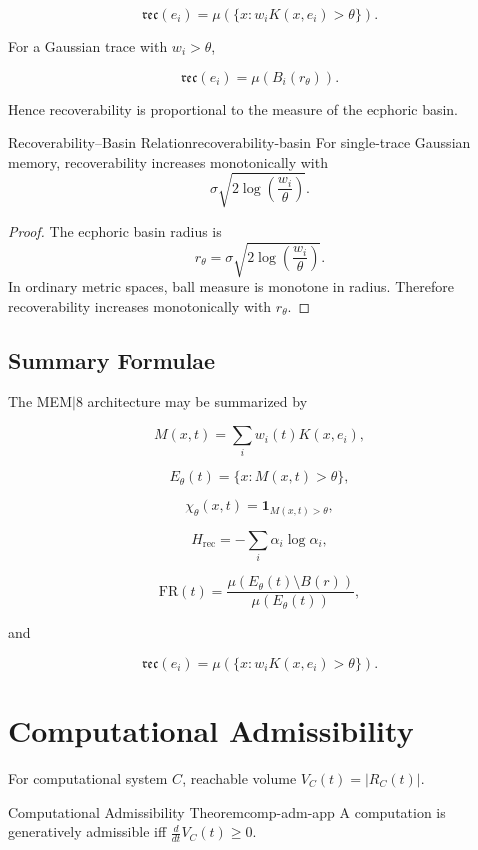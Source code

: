\documentclass[12pt,twoside,openright]{book}
\newcommand{\reco}{\mathfrak{rec}}
\begin{document}
\[
\reco(e_i)
=
\mu
\left(
\{x:w_iK(x,e_i)>\theta\}
\right).
\]

For a Gaussian trace with \(w_i>\theta\),

\[
\reco(e_i)
=
\mu(B_i(r_\theta)).
\]

Hence recoverability is proportional to the measure of the
ecphoric basin.

\begin{proposition}{Recoverability--Basin Relation}{recoverability-basin}
  For single-trace Gaussian memory, recoverability
  increases monotonically with
  \[
    \sigma
    \sqrt{
      2\log\left(\frac{w_i}{\theta}\right)
    }.
  \]
\end{proposition}

\begin{proof}
  The ecphoric basin radius is
  \[
    r_\theta
=
    \sigma
    \sqrt{
      2\log\left(\frac{w_i}{\theta}\right)
    }.
  \]
  In ordinary metric spaces, ball measure is monotone in
  radius. Therefore recoverability increases monotonically
  with \(r_\theta\).
\end{proof}

\subsection{Summary Formulae}

The MEM\(|\)8 architecture may be summarized by

\[
M(x,t)
=
\sum_i w_i(t)K(x,e_i),
\]

\[
E_\theta(t)
=
\{x:M(x,t)>\theta\},
\]

\[
\chi_\theta(x,t)
=
\mathbf 1_{M(x,t)>\theta},
\]

\[
H_{\mathrm{rec}}
=
-\sum_i\alpha_i\log\alpha_i,
\]

\[
\mathrm{FR}(t)
=
\frac{\mu(E_\theta(t)\setminus B(r))}
{\mu(E_\theta(t))},
\]

and

\[
\reco(e_i)
=
\mu
\left(
\{x:w_iK(x,e_i)>\theta\}
\right).
\]

\section{Computational Admissibility}

For computational system $C$, reachable volume
$V_C(t) = |R_C(t)|$.

\begin{theorem}{Computational Admissibility Theorem}{comp-adm-app}
  A computation is generatively admissible iff
  $\frac{d}{dt}V_C(t) \ge 0$.
\end{theorem}
\end{document}
